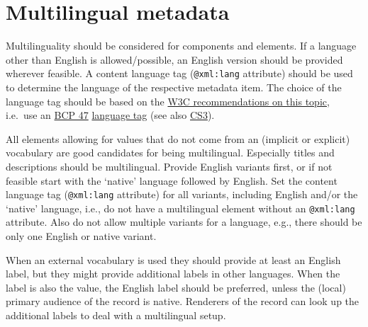 \section{Multilingual metadata}\label{multilingual-metadata}

Multilinguality should be considered for components and elements. If a language other than English is allowed/possible, an English version should be provided wherever feasible. A content language tag (\texttt{@xml:lang} attribute) should be used to determine the language of the respective metadata item. The choice of the language tag should be based on the
\href{https://www.w3.org/International/questions/qa-choosing-language-tags}{W3C recommendations on this topic}, i.e.~use an
\href{https://tools.ietf.org/rfc/bcp/bcp47.txt}{BCP 47}
\href{https://www.iana.org/assignments/language-subtag-registry/language-subtag-registry}{language
tag} (see also \hyperref[cs3]{CS3}).

All elements allowing for values that do not come from an (implicit or explicit) vocabulary are good candidates for being multilingual. Especially titles and descriptions should be multilingual. Provide English variants first, or if not feasible start with the `native' language followed by English. Set the content language tag (\texttt{@xml:lang} attribute) for all variants, including English and/or the `native' language, i.e., do not have a multilingual element without an \texttt{@xml:lang} attribute. Also do not allow multiple
variants for a language, e.g., there should be only one English or native variant.

When an external vocabulary is used they should provide at least an English label, but they might provide additional labels in other languages. When the label is also the value, the English label should be preferred, unless the (local) primary audience of the record is native. Renderers of the record can look up the additional labels to deal with a
multilingual setup.


